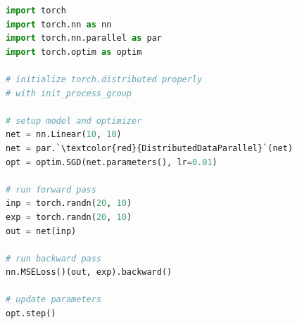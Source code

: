 
\begin{lstlisting}[language=Python]
import torch
import torch.nn as nn
import torch.nn.parallel as par
import torch.optim as optim

# initialize torch.distributed properly 
# with init_process_group

# setup model and optimizer
net = nn.Linear(10, 10)
net = par.`\textcolor{red}{DistributedDataParallel}`(net)
opt = optim.SGD(net.parameters(), lr=0.01)

# run forward pass
inp = torch.randn(20, 10)
exp = torch.randn(20, 10)
out = net(inp)

# run backward pass
nn.MSELoss()(out, exp).backward()

# update parameters
opt.step()
\end{lstlisting}
\vspace{-1em}

